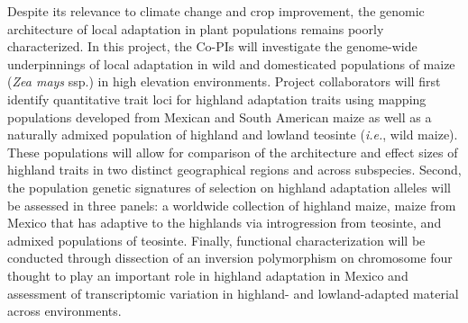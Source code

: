 

%
%
%
%
%
%


Despite its relevance to climate change and crop improvement, the genomic architecture of local adaptation in plant populations remains poorly characterized.  In this project, the Co-PIs will investigate the genome-wide underpinnings of local adaptation in wild and domesticated populations of maize (\emph{Zea mays} ssp.) in high elevation environments.  Project collaborators will first identify quantitative trait loci for highland adaptation traits using mapping populations developed from Mexican and South American maize as well as a naturally admixed population of highland and lowland teosinte (\emph{i.e.}, wild maize).  These populations will allow for comparison of the architecture and effect sizes of highland traits in two distinct geographical regions and across subspecies.  Second, the population genetic signatures of selection on highland adaptation alleles will be assessed in three panels: a worldwide collection of highland maize, maize from Mexico that has adaptive to the highlands via introgression from teosinte, and admixed populations of  teosinte.  Finally, functional characterization will be conducted through dissection of an inversion polymorphism on chromosome four thought to play an important role in highland adaptation in Mexico and assessment of transcriptomic variation in highland- and lowland-adapted material across environments.

